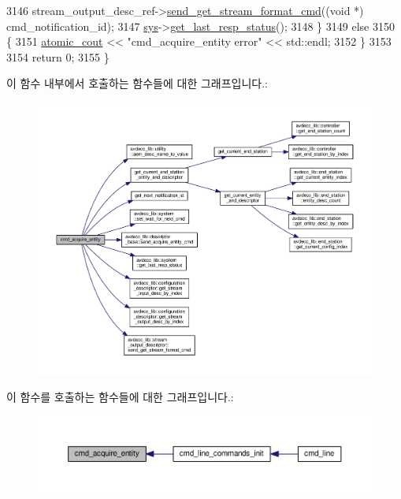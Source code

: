 \begin{DoxyCode}
3146         stream\_output\_desc\_ref->\hyperlink{classavdecc__lib_1_1stream__output__descriptor_a4ba58b32ff7b9f5d961a0a5eb46d4c6c}{send\_get\_stream\_format\_cmd}((\textcolor{keywordtype}{void} *)
      cmd\_notification\_id);
3147         \hyperlink{classcmd__line_a485db4800e331cb4052c447fdf5d154e}{sys}->\hyperlink{classavdecc__lib_1_1system_aa63e8d1a4e51f695cdcccc9340922407}{get\_last\_resp\_status}();
3148     \}
3149     \textcolor{keywordflow}{else}
3150     \{
3151         \hyperlink{cmd__line_8h_a0bc38ccc65c79ba06c6fcd7b4bf554c3}{atomic\_cout} << \textcolor{stringliteral}{"cmd\_acquire\_entity error"} << std::endl;
3152     \}
3153 
3154     \textcolor{keywordflow}{return} 0;
3155 \}
\end{DoxyCode}


이 함수 내부에서 호출하는 함수들에 대한 그래프입니다.\+:
\nopagebreak
\begin{figure}[H]
\begin{center}
\leavevmode
\includegraphics[width=350pt]{classcmd__line_aab543450aab7d747196e9c57ae393081_cgraph}
\end{center}
\end{figure}




이 함수를 호출하는 함수들에 대한 그래프입니다.\+:
\nopagebreak
\begin{figure}[H]
\begin{center}
\leavevmode
\includegraphics[width=350pt]{classcmd__line_aab543450aab7d747196e9c57ae393081_icgraph}
\end{center}
\end{figure}


